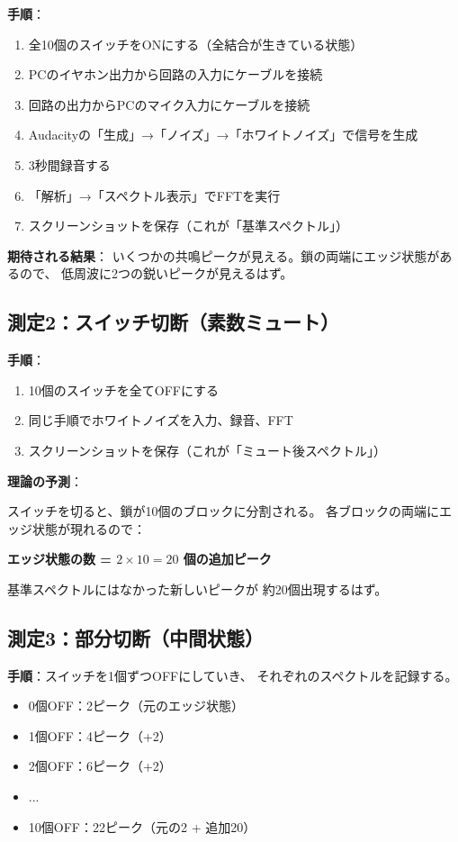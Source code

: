 \documentclass[12pt,a4paper]{article}
\begin{document}
\textbf{手順}：
\begin{enumerate}
\item 全10個のスイッチをONにする（全結合が生きている状態）
\item PCのイヤホン出力から回路の入力にケーブルを接続
\item 回路の出力からPCのマイク入力にケーブルを接続
\item Audacityの「生成」→「ノイズ」→「ホワイトノイズ」で信号を生成
\item 3秒間録音する
\item 「解析」→「スペクトル表示」でFFTを実行
\item スクリーンショットを保存（これが「基準スペクトル」）
\end{enumerate}

\textbf{期待される結果}：
いくつかの共鳴ピークが見える。鎖の両端にエッジ状態があるので、
低周波に2つの鋭いピークが見えるはず。

\subsection{測定2：スイッチ切断（素数ミュート）}

\textbf{手順}：
\begin{enumerate}
\item 10個のスイッチを全てOFFにする
\item 同じ手順でホワイトノイズを入力、録音、FFT
\item スクリーンショットを保存（これが「ミュート後スペクトル」）
\end{enumerate}

\textbf{理論の予測}：

\begin{keybox}[予測される結果]
スイッチを切ると、鎖が10個のブロックに分割される。
各ブロックの両端にエッジ状態が現れるので：

\textbf{エッジ状態の数 = $2 \times 10 = 20$ 個の追加ピーク}

基準スペクトルにはなかった新しいピークが
約20個出現するはず。
\end{keybox}

\subsection{測定3：部分切断（中間状態）}

\textbf{手順}：スイッチを1個ずつOFFにしていき、
それぞれのスペクトルを記録する。

\begin{itemize}
\item 0個OFF：2ピーク（元のエッジ状態）
\item 1個OFF：4ピーク（+2）
\item 2個OFF：6ピーク（+2）
\item ...
\item 10個OFF：22ピーク（元の2 + 追加20）
\end{itemize}
\end{document}

